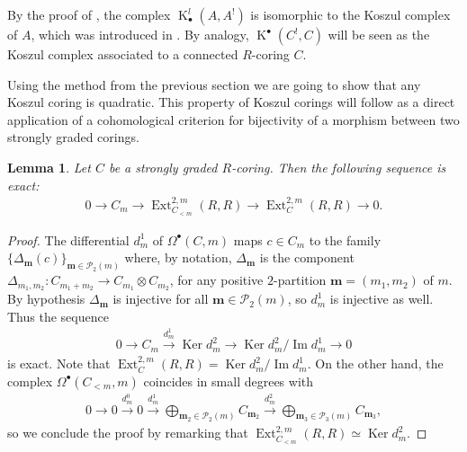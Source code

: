 \documentclass[pdftex]{sigma}
\newcommand{\bs}[1]{\boldsymbol{#1}}
\DeclareMathOperator{\Ker}{Ker}
\DeclareMathOperator{\im}{Im}
\DeclareMathOperator{\K}{K}
\newcommand\ot{\otimes}
\renewcommand{\^}[1]{\mbox{$^{\left( #1 \right)}$}}
\renewcommand{\_}[1]{\mbox{$_{\left( #1 \right)}$}}
\newcommand{\Ext}{\operatorname{Ext}}
\numberwithin{equation}{section}
\newtheorem{Lemma}[Theorem]{Lemma}
\begin{document}
\begin{Remark}
 By the proof of \cite[Theorem~2.14]{jps}, the complex $\K_\bullet^l(A,A^!)$ is isomorphic to the Koszul complex of $A$, which was introduced in \cite[p.~483]{bgs}. By analogy, $\operatorname{K}^\bullet(C^!,C)$ will be seen as the Koszul complex associated to a connected $R$-coring $C$.
\end{Remark}

Using the method from the previous section we are going to show that any Koszul coring is quadratic. This property of Koszul corings will follow as a direct application of a cohomological criterion for bijectivity of a morphism between two strongly graded corings.

\begin{Lemma} \label{lemmaext}
Let $C$ be a strongly graded $R$-coring. Then the following sequence is exact:
\begin{gather*}
0 \longrightarrow C_m \longrightarrow \operatorname{Ext}^{2,m}_{C_{<m}} (R,R) \longrightarrow \operatorname{Ext}^{2,m}_C(R,R) \longrightarrow 0.
\end{gather*}
\end{Lemma}

\begin{proof} The dif\/ferential $d_m^1$ of $\Omega^\bullet(C,m)$ maps $c \in C_m$ to the family $\{\Delta_{\bs{m}}(c) \}_{\bs{m}\in\mathscr{P}_2(m)}$ where, by notation, $\Delta_{\bs{m}}$ is the component $\Delta_{m_1,m_2}\colon C_{m_1+m_2}\to C_{m_1}\ot C_{m_2}$, for any positive $2$-partition $\bs{m}=(m_1,m_2)$ of $m$. By hypothesis $\Delta_{\bs{m}}$ is injective for all $\bs{m}\in\mathscr{P}_2(m)$, so $d_m^1$ is injective as well. Thus the sequence
\begin{gather*}
 0 \longrightarrow C_m \xrightarrow{d_m^1} \Ker d_m^2 \longrightarrow \Ker d_m^2/\im d_m^1 \longrightarrow 0
\end{gather*}
is exact. Note that $\operatorname{Ext}^{2,m}_C(R,R) =\Ker d_m^2/\im d_m^1$. On the other hand, the complex $\Omega^\bullet(C_{<m},m)$ coincides in small degrees with
\begin{gather*}
0 \longrightarrow 0 \xrightarrow{d_m^0} 0 \xrightarrow{d_m^1} \bigoplus \limits_{\boldsymbol{m}_2\in\mathscr{P}_2(m)} C_{\boldsymbol{m}_2} \xrightarrow{d_m^2}  \bigoplus \limits_{\boldsymbol{m}_3\in\mathscr{P}_{3}(m)} C_{\boldsymbol{m}_3} ,
\end{gather*}
so we conclude the proof by remarking that $\Ext^{2,m}_{C_{<m}}(R,R) \simeq \Ker d_m^2.$
\end{proof}
\end{document}
